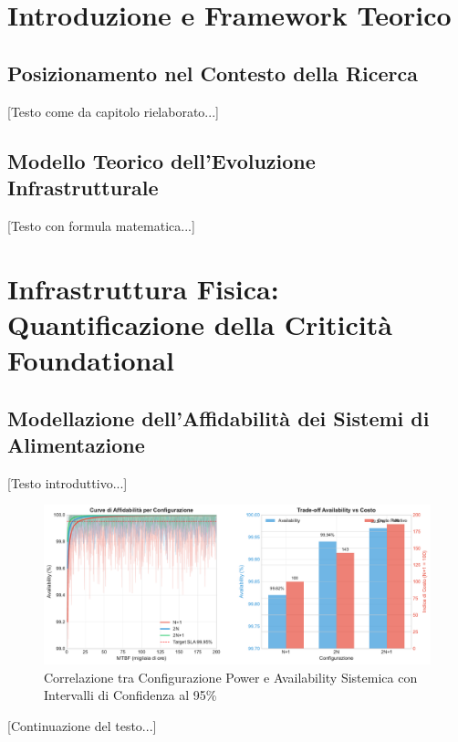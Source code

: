 \section{Introduzione e Framework Teorico}

\subsection{Posizionamento nel Contesto della Ricerca}

[Testo come da capitolo rielaborato...]

\subsection{Modello Teorico dell'Evoluzione Infrastrutturale}

[Testo con formula matematica...]

\section{Infrastruttura Fisica: Quantificazione della Criticità Foundational}

\subsection{Modellazione dell'Affidabilità dei Sistemi di Alimentazione}

[Testo introduttivo...]

\begin{figure}[htbp]
\centering
\includegraphics[width=\textwidth]{figura_3_1_power_availability.pdf}
\caption{Correlazione tra Configurazione Power e Availability Sistemica con Intervalli di Confidenza al 95\%}
\label{fig:power_availability}
\end{figure}

[Continuazione del testo...]

